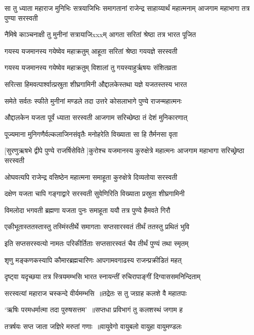 \threelineshloka
{सा तु ध्याता महाराज मुनिभिः सत्रयाजिभिः}
{समागतानां राजेन्द्र साहाय्यार्थं महात्मनाम्}
{आजगाम महाभागा तत्र पुण्या सरस्वती}


\twolineshloka
{नैमिषे काञ्चनाक्षी तु मुनीनां सत्रायाजिxxxम्}
{आगता सरितां श्रेष्ठा तत्र भारत पूजित}


\twolineshloka
{गयस्य यजमानस्य गयेष्वेव महाक्रतुम्}
{आहूता सरितां श्रेष्ठा गययज्ञे सरस्वती}


\twolineshloka
{गयस्य यजमानस्य गयेष्वेव महाक्रतुम्}
{विशालां तु गयस्याहुर्ऋषयः संशितव्रता}


\twolineshloka
{सरित्सा हिमवत्पार्श्वात्प्रस्रुता शीघ्रगामिनी}
{औद्दालकेस्तथा यज्ञे यजतस्तस्य भारत}


\twolineshloka
{समेते सर्वतः स्फीते मुनीनां मण्डले तदा}
{उत्तरे कोसलाभागे पुण्ये राजन्महात्मनः}


\twolineshloka
{औद्दालकेन यजता पूर्वं ध्याता सरस्वती}
{आजगाम सरिच्छेष्ठा तं देशं मुनिकारणात्}


\twolineshloka
{पूज्यमाना मुनिगणैर्वल्कलाजिनसंवृतैः}
{मनोहरेति विख्याता सा हि तैर्मनसा वृता}


\threelineshloka
{[सुरणुऋषभे द्वीपे पुण्ये राजर्षिसेविते}
{]कुरोश्च यजमानस्य कुरुक्षेत्रे महात्मनः}
{आजगाम महाभागा सरिच्छ्रेष्ठा सरस्वती}


\twolineshloka
{ओघवत्यपि राजेन्द्र वसिष्ठेन महात्मना}
{समाहूता कुरुक्षेत्रे दिव्यतोया सरस्वती}


\twolineshloka
{दक्षेण यजता चापि गङ्गाद्वारे सरस्वती}
{सुवेणिरिति विख्याता प्रस्रुता शीघ्रगामिनी}


\twolineshloka
{विमलोदा भगवती ब्रह्मणा यजता पुनः}
{समाहूता ययौ तत्र पुण्ये हैमवते गिरौ}


\twolineshloka
{एकीभूतास्ततस्तास्तु तस्मिंस्तीर्थे समागताः}
{सप्तसारस्वतं तीर्थं ततस्तु प्रथितं भुवि}


\twolineshloka
{इति सप्तसरस्वत्यो नामतः परिकीर्तिताः}
{सप्तसारस्वतं चैव तीर्थं पुण्यं तथा स्मृतम्}


\twolineshloka
{शृणु मङ्कणकस्यापि कौमारब्रह्मचारिणः}
{आपगामवगाढस्य राजन्प्रक्रीडितं महत्}


\threelineshloka
{दृष्ट्वा यदृच्छया तत्र स्त्रियमम्भसि भारत}
{स्नायन्तीं रुचिरापाङ्गीं दिग्वाससमनिन्दिताम्}
{}


\twolineshloka
{सरस्वत्यां महाराज चस्कन्दे वीर्यमम्भसि ॥तद्रेतः स तु जग्राह कलशे वै महातपाः}
{}


\twolineshloka
{`ऋषिः परमधर्मात्मा तदा पुरुषसत्तम' ॥सप्तधा प्रविभागं तु कलशस्थं जगाम ह}
{}


\twolineshloka
{तत्रर्षयः सप्त जाता जज्ञिरे मरुतां गणाः ॥वायुवेगो वायुबलो वायुहा वायुमण्डलः}
{}


